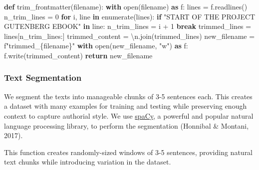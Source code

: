 \documentclass[
]{article}
\newenvironment{Shaded}{}{}
\newcommand{\BuiltInTok}[1]{\textcolor[rgb]{0.00,0.50,0.00}{#1}}
\newcommand{\CharTok}[1]{\textcolor[rgb]{0.25,0.44,0.63}{#1}}
\newcommand{\ControlFlowTok}[1]{\textcolor[rgb]{0.00,0.44,0.13}{\textbf{#1}}}
\newcommand{\DecValTok}[1]{\textcolor[rgb]{0.25,0.63,0.44}{#1}}
\newcommand{\ImportTok}[1]{\textcolor[rgb]{0.00,0.50,0.00}{\textbf{#1}}}
\newcommand{\KeywordTok}[1]{\textcolor[rgb]{0.00,0.44,0.13}{\textbf{#1}}}
\newcommand{\NormalTok}[1]{#1}
\newcommand{\OperatorTok}[1]{\textcolor[rgb]{0.40,0.40,0.40}{#1}}
\newcommand{\SpecialCharTok}[1]{\textcolor[rgb]{0.25,0.44,0.63}{#1}}
\newcommand{\SpecialStringTok}[1]{\textcolor[rgb]{0.73,0.40,0.53}{#1}}
\newcommand{\StringTok}[1]{\textcolor[rgb]{0.25,0.44,0.63}{#1}}
\begin{document}
\begin{Shaded}
\begin{Highlighting}[]
\KeywordTok{def}\NormalTok{ trim\_frontmatter(filename):}
    \ControlFlowTok{with} \BuiltInTok{open}\NormalTok{(filename) }\ImportTok{as}\NormalTok{ f:}
\NormalTok{        lines }\OperatorTok{=}\NormalTok{ f.readlines()}
\NormalTok{    n\_trim\_lines }\OperatorTok{=} \DecValTok{0}
    \ControlFlowTok{for}\NormalTok{ i, line }\KeywordTok{in} \BuiltInTok{enumerate}\NormalTok{(lines):}
        \ControlFlowTok{if} \StringTok{"START OF THE PROJECT GUTENBERG EBOOK"} \KeywordTok{in}\NormalTok{ line:}
\NormalTok{            n\_trim\_lines }\OperatorTok{=}\NormalTok{ i }\OperatorTok{+} \DecValTok{1}
            \ControlFlowTok{break}
\NormalTok{    trimmed\_lines }\OperatorTok{=}\NormalTok{ lines[n\_trim\_lines:]}
\NormalTok{    trimmed\_content }\OperatorTok{=} \StringTok{\textquotesingle{}}\CharTok{\textbackslash{}n}\StringTok{\textquotesingle{}}\NormalTok{.join(trimmed\_lines)}
\NormalTok{    new\_filename }\OperatorTok{=} \SpecialStringTok{f"trimmed\_}\SpecialCharTok{\{}\NormalTok{filename}\SpecialCharTok{\}}\SpecialStringTok{"}
    \ControlFlowTok{with} \BuiltInTok{open}\NormalTok{(new\_filename, }\StringTok{"w"}\NormalTok{) }\ImportTok{as}\NormalTok{ f:}
\NormalTok{        f.write(trimmed\_content)}
    \ControlFlowTok{return}\NormalTok{ new\_filename}
\end{Highlighting}
\end{Shaded}

\subsubsection{Text Segmentation}\label{text-segmentation}

We segment the texts into manageable chunks of 3-5 sentences each. This
creates a dataset with many examples for training and testing while
preserving enough context to capture authorial style. We use
\href{https://spacy.io/}{spaCy}, a powerful and popular natural language
processing library, to perform the segmentation (Honnibal \& Montani,
2017).

This function creates randomly-sized windows of 3-5 sentences, providing
natural text chunks while introducing variation in the dataset.
\end{document}
